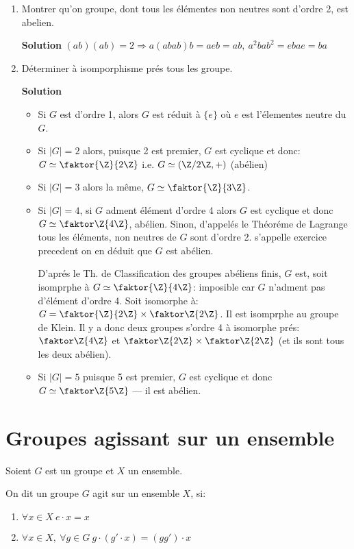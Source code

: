 \begin{examplebox}
	\begin{enumerate}
		\item Montrer qu'on groupe, dont tous les élémentes non neutres sont d'ordre 2, est abelien.
		
		\textbf{Solution} $(ab)(ab)=2 \Rightarrow a(abab)b=aeb=ab,\ a^2bab^2=ebae=ba$
		\item Déterminer à isomporphisme prés tous les groupe.
		
		\textbf{Solution} 
		\begin{itemize}
			\item Si $G$ est d'ordre 1, alors $G$ est réduit à $\{e\}$ où $e$ est l'élementes neutre du $G$.
			\item Si $|G|=2$ alors, puisque 2 est premier, $G$ est cyclique et donc: $G\simeq \faktor{\Z}{2\Z}$ i.e. $G\simeq (\Z/2\Z, +)$ (abélien)
			\item Si $|G|=3$ alors la même, $G\simeq \faktor{\Z}{3\Z}$.
			\item Si $|G|=4$, si $G$ adment élément d'ordre 4 alors $G$ est cyclique et donc $G\simeq \faktor\Z{4\Z}$, abélien. Sinon, d'appelés le Théoréme de Lagrange tous les éléments, non neutres de $G$ sont d'ordre 2. s'appelle exercice precedent on en déduit que $G$ est abélien.
			
			D'aprés le Th. de Classification des groupes abéliens finis, $G$ est, soit isomprphe à $G\simeq \faktor{\Z}{4\Z}$: imposible car $G$ n'adment pas d'élément d'ordre 4. Soit isomorphe à: $G=\faktor{\Z}{2\Z}\times \faktor\Z{2\Z}$. Il est isomprphe au groupe de Klein. Il y a donc deux groupes s'ordre 4 à isomorphe prés: $\faktor\Z{4\Z}$ et $\faktor\Z{2\Z}\times\faktor\Z{2\Z}$ (et ils sont tous les deux abélien).
			\item Si $|G|=5$ puisque 5 est premier, $G$ est cyclique et donc $G \simeq \faktor\Z{5\Z}$ --- il est abélien.
		\end{itemize}
	\end{enumerate}
\end{examplebox}

\section{Groupes agissant sur un ensemble} %

Soient $G$ est un groupe et $X$ un ensemble.
\begin{definition}
	On dit un groupe $G$ agit sur un ensemble $X$, si:
	\begin{enumerate}
		\item $\forall x\in X\ e\cdot x= x$
		\item $\forall x\in X,\ \forall g\in G\ g\cdot(g'\cdot x)=(gg')\cdot x$
	\end{enumerate}
\end{definition}

